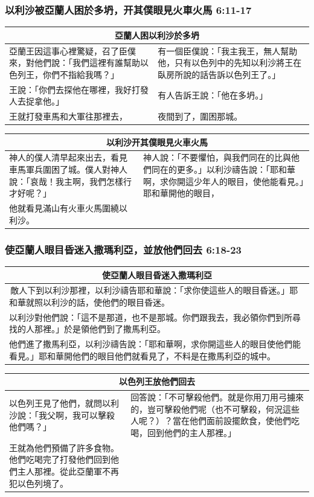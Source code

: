 \subsubsection{以利沙被亞蘭人困於多坍，开其僕眼見火車火馬 6:11-17}
\begin{tabular}{p{}|p{4.25cm}}\hline
\multicolumn{2}{c}{亞蘭人困以利沙於多坍}\\\hline
亞蘭王因這事心裡驚疑，召了臣僕來，對他們說：「我們這裡有誰幫助以色列王，你們不指給我嗎？」&有一個臣僕說：「我主我王，無人幫助他，只有以色列中的先知以利沙將王在臥房所說的話告訴以色列王了。」\\\hline
王說：「你們去探他在哪裡，我好打發人去捉拿他。」&有人告訴王說：「他在多坍。」\\\hline
王就打發車馬和大軍往那裡去，&夜間到了，圍困那城。\\\hline
\end{tabular}
\quad
\hspace{5mm}
\begin{tabular}{p{}|p{}}\hline
\multicolumn{2}{c}{以利沙开其僕眼見火車火馬}\\\hline
神人的僕人清早起來出去，看見車馬軍兵圍困了城。僕人對神人說：「哀哉！我主啊，我們怎樣行才好呢？」&神人說：「不要懼怕，與我們同在的比與他們同在的更多。」以利沙禱告說：「耶和華啊，求你開這少年人的眼目，使他能看見。」耶和華開他的眼目，\\\hline
他就看見滿山有火車火馬圍繞以利沙。 &\\\hline
\end{tabular}


\subsubsection{使亞蘭人眼目昏迷入撒瑪利亞，並放他們回去 6:18-23}
\begin{tabular}{p{7.75cm}}\hline
\multicolumn{1}{c}{使亞蘭人眼目昏迷入撒瑪利亞}\\\hline
 敵人下到以利沙那裡，以利沙禱告耶和華說：「求你使這些人的眼目昏迷。」耶和華就照以利沙的話，使他們的眼目昏迷。\\\hline
以利沙對他們說：「這不是那道，也不是那城。你們跟我去，我必領你們到所尋找的人那裡。」於是領他們到了撒馬利亞。\\\hline
他們進了撒馬利亞，以利沙禱告說：「耶和華啊，求你開這些人的眼目使他們能看見。」耶和華開他們的眼目他們就看見了，不料是在撒馬利亞的城中。\\\hline
\end{tabular}
\quad
\begin{tabular}{p{4.15cm}|p{5.25cm}}\hline
\multicolumn{2}{c}{以色列王放他們回去}\\\hline
以色列王見了他們，就問以利沙說：「我父啊，我可以擊殺他們嗎？」&回答說：「不可擊殺他們。就是你用刀用弓擄來的，豈可擊殺他們呢（也不可擊殺，何況這些人呢？）？當在他們面前設擺飲食，使他們吃喝，回到他們的主人那裡。」\\\hline
王就為他們預備了許多食物。他們吃喝完了打發他們回到他們主人那裡。從此亞蘭軍不再犯以色列境了。&\\\hline
\end{tabular}



